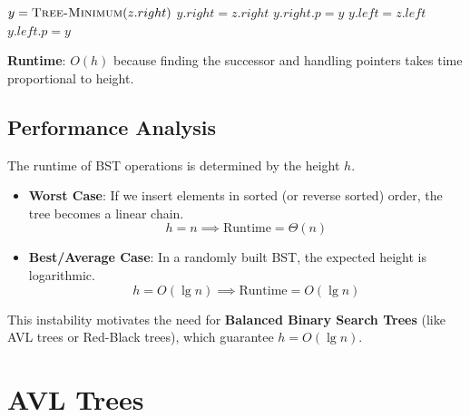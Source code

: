 \documentclass[12pt]{article}
\theoremstyle{blueplain}
\theoremstyle{bluedef}
\theoremstyle{blueremark}
\begin{document}
\begin{algorithm}
    \caption{Tree Delete}\label{alg:treeDelete}
    \begin{algorithmic}[1]
         
        \State {}
         
        \State {}
        \Else {}
        \State $y = \Call{Tree-Minimum}{z.right}$ 
         
        \State {} 
        \State $y.right = z.right$
        \State $y.right.p = y$
        \EndIf
        \State {} 
        \State $y.left = z.left$
        \State $y.left.p = y$
        \EndIf
        \EndProcedure
    \end{algorithmic}
\end{algorithm}
\textbf{Runtime}: $O(h)$ because finding the successor and handling pointers takes time proportional to height.

\subsection{Performance Analysis}

The runtime of BST operations is determined by the height $h$.
\begin{itemize}
    \item \textbf{Worst Case}: If we insert elements in sorted (or reverse sorted) order, the tree becomes a linear chain.
          \[ h = n \implies \text{Runtime} = \Theta(n) \]
    \item \textbf{Best/Average Case}: In a randomly built BST, the expected height is logarithmic.
          \[ h = O(\lg n) \implies \text{Runtime} = O(\lg n) \]
\end{itemize}

This instability motivates the need for \textbf{Balanced Binary Search Trees} (like AVL trees or Red-Black trees), which guarantee $h = O(\lg n)$.

\clearpage


\section{AVL Trees}
\end{document}
